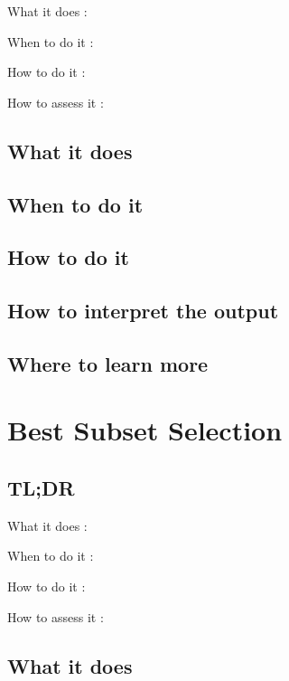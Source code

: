 \documentclass[
]{book}
\begin{document}
What it does
:

When to do it
:

How to do it
:

How to assess it
:

\hypertarget{what-it-does-10}{%
\section{What it does}\label{what-it-does-10}}

\hypertarget{when-to-do-it-10}{%
\section{When to do it}\label{when-to-do-it-10}}

\hypertarget{how-to-do-it-10}{%
\section{How to do it}\label{how-to-do-it-10}}

\hypertarget{how-to-interpret-the-output-10}{%
\section{How to interpret the output}\label{how-to-interpret-the-output-10}}

\hypertarget{where-to-learn-more-10}{%
\section{Where to learn more}\label{where-to-learn-more-10}}

\hypertarget{best-subset-selection}{%
\chapter{Best Subset Selection}\label{best-subset-selection}}

\hypertarget{tldr-11}{%
\section{TL;DR}\label{tldr-11}}

What it does
:

When to do it
:

How to do it
:

How to assess it
:

\hypertarget{what-it-does-11}{%
\section{What it does}\label{what-it-does-11}}
\end{document}
